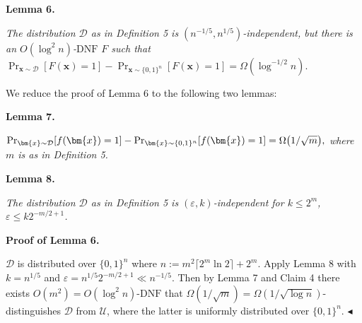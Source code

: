 \documentclass[10pt,a4paper]{article}
\begin{document}
\par\medskip\noindent\textbf{
\textbf{Lemma 6}\textbf{.}
}\par



\emph{The distribution $\mathcal{D}$ as in Definition 5 is $(n^{-1/5},n^{1/5})$-independent, but there is
an $O(\log^{2}n)$-$\mathrm{DNF}$ $F$ such that
$\Pr_{\bm{x}\sim\mathcal{D}}[F(\bm{x})=1]-\Pr_{\bm{x}\sim\{0,1\}^{n}}[F(\bm{x})=1]=\Omega(\log^{-1/2}n).$}\par






We reduce the proof of Lemma 6 to the following two lemmas:\par





\par\medskip\noindent\textbf{
\textbf{Lemma 7}\textbf{.}
}\par



$\Pr_{\bm{x}\sim\mathcal{D}}[f(\bm{x})=1]-\Pr_{\bm{x}\sim\{0,1\}^{n}}[f(\bm{x})=1]=\Omega\big{(}1/\sqrt{m}\big{)},$\emph{
where $m$ is as in Definition 5.}\par







\par\medskip\noindent\textbf{
\textbf{Lemma 8}\textbf{.}
}\par



\emph{The distribution $\mathcal{D}$ as in Definition 5 is $(\varepsilon,k)$-independent for $k\leq 2^{m}$, $\varepsilon\leq k2^{-m/2+1}$.}\par







\par\medskip\noindent\textbf{Proof of Lemma 6.}\par




$\mathcal{D}$ is distributed over $\{0,1\}^{n}$ where $n:=m^{2}\lceil 2^{m}\ln 2\rceil+2^{m}$. Apply Lemma 8 with $k=n^{1/5}$ and $\varepsilon=n^{1/5}2^{-m/2+1}\ll n^{-1/5}$. Then by Lemma 7 and Claim 4 there exists $O(m^{2})=O(\log^{2}n)$-$\mathrm{DNF}$ that $\Omega(1/\sqrt{m})=\Omega(1/\sqrt{\log n})$-distinguishes $\mathcal{D}$ from $\mathcal{U}$, where the latter is uniformly distributed over $\{0,1\}^{n}$.
$\blacktriangleleft$\par
\end{document}
